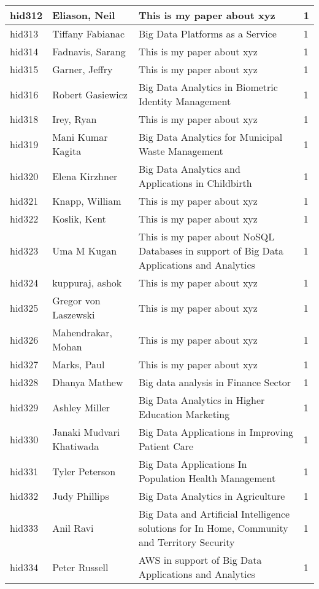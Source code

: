 \documentclass[12pt]{article}
\begin{document}
\begin{footnotesize}
\begin{longtable}{|p{1cm}p{5cm}p{9cm}p{1cm}|}
hid312 & Eliason, Neil & This is my paper about xyz & 1 \\
\hline
hid313 & Tiffany Fabianac & Big Data Platforms as a Service & 1 \\
\hline
hid314 & Fadnavis, Sarang & This is my paper about xyz & 1 \\
\hline
hid315 & Garner, Jeffry & This is my paper about xyz & 1 \\
\hline
hid316 & Robert Gasiewicz & Big Data Analytics in Biometric Identity Management & 1 \\
\hline
hid318 & Irey, Ryan & This is my paper about xyz & 1 \\
\hline
hid319 & Mani Kumar Kagita & Big Data Analytics for Municipal Waste Management & 1 \\
\hline
hid320 & Elena Kirzhner & Big Data Analytics and Applications in Childbirth & 1 \\
\hline
hid321 & Knapp, William & This is my paper about xyz & 1 \\
\hline
hid322 & Koslik, Kent & This is my paper about xyz & 1 \\
\hline
hid323 & Uma M Kugan & This is my paper about NoSQL Databases in support of Big Data Applications and Analytics & 1 \\
\hline
hid324 & kuppuraj, ashok & This is my paper about xyz & 1 \\
\hline
hid325 & Gregor von Laszewski & This is my paper about xyz & 1 \\
\hline
hid326 & Mahendrakar, Mohan & This is my paper about xyz & 1 \\
\hline
hid327 & Marks, Paul & This is my paper about xyz & 1 \\
\hline
hid328 & Dhanya Mathew & Big data analysis in Finance Sector & 1 \\
\hline
hid329 & Ashley Miller & Big Data Analytics in Higher Education Marketing & 1 \\
\hline
hid330 & Janaki Mudvari Khatiwada & Big Data Applications in Improving Patient Care & 1 \\
\hline
hid331 & Tyler Peterson & Big Data Applications In Population Health Management & 1 \\
\hline
hid332 & Judy Phillips & Big Data Analytics in Agriculture & 1 \\
\hline
hid333 & Anil Ravi & Big Data and Artificial Intelligence solutions for In Home, Community and Territory Security & 1 \\
\hline
hid334 & Peter Russell & AWS in support of Big Data Applications and Analytics & 1 \\

\end{longtable}
\end{footnotesize}
\end{document}

